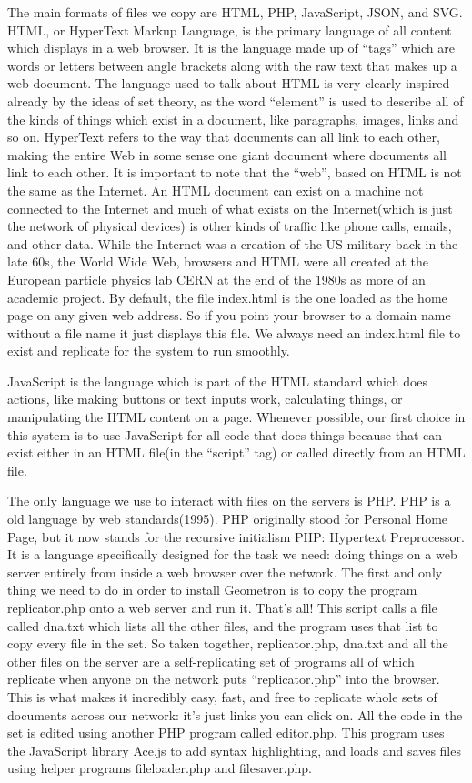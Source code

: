 The main formats of files we copy are HTML, PHP, JavaScript, JSON, and
SVG. HTML, or HyperText Markup Language, is the primary language of all
content which displays in a web browser. It is the language made up of
``tags'' which are words or letters between angle brackets along with
the raw text that makes up a web document. The language used to talk
about HTML is very clearly inspired already by the ideas of set theory,
as the word ``element'' is used to describe all of the kinds of things
which exist in a document, like paragraphs, images, links and so on.
HyperText refers to the way that documents can all link to each other,
making the entire Web in some sense one giant document where documents
all link to each other. It is important to note that the ``web'', based
on HTML is not the same as the Internet. An HTML document can exist on a
machine not connected to the Internet and much of what exists on the
Internet(which is just the network of physical devices) is other kinds
of traffic like phone calls, emails, and other data. While the Internet
was a creation of the US military back in the late 60s, the World Wide
Web, browsers and HTML were all created at the European particle physics
lab CERN at the end of the 1980s as more of an academic project. By
default, the file index.html is the one loaded as the home page on any
given web address. So if you point your browser to a domain name without
a file name it just displays this file. We always need an index.html
file to exist and replicate for the system to run smoothly.

JavaScript is the language which is part of the HTML standard which does
actions, like making buttons or text inputs work, calculating things, or
manipulating the HTML content on a page. Whenever possible, our first
choice in this system is to use JavaScript for all code that does things
because that can exist either in an HTML file(in the ``script'' tag) or
called directly from an HTML file.

The only language we use to interact with files on the servers is PHP.
PHP is a old language by web standards(1995). PHP originally stood for
Personal Home Page, but it now stands for the recursive initialism PHP:
Hypertext Preprocessor. It is a language specifically designed for the
task we need: doing things on a web server entirely from inside a web
browser over the network. The first and only thing we need to do in
order to install Geometron is to copy the program replicator.php onto a
web server and run it. That's all! This script calls a file called
dna.txt which lists all the other files, and the program uses that list
to copy every file in the set. So taken together, replicator.php,
dna.txt and all the other files on the server are a self-replicating set
of programs all of which replicate when anyone on the network puts
``replicator.php'' into the browser. This is what makes it incredibly
easy, fast, and free to replicate whole sets of documents across our
network: it's just links you can click on. All the code in the set is
edited using another PHP program called editor.php. This program uses
the JavaScript library Ace.js to add syntax highlighting, and loads and
saves files using helper programs fileloader.php and filesaver.php.

